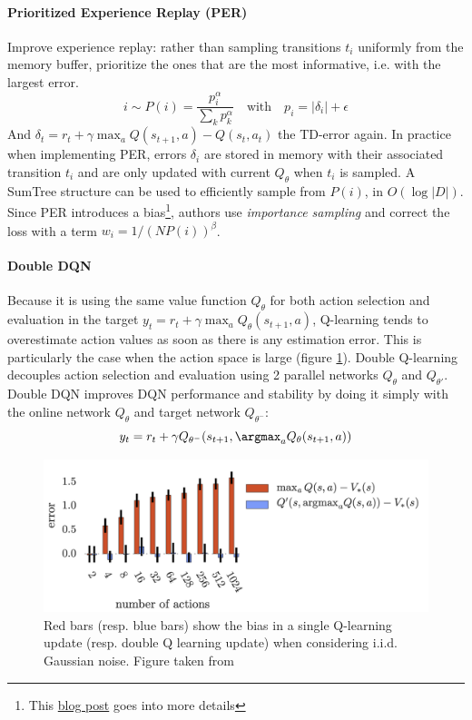 \paragraph{Prioritized Experience Replay (PER) \cite{schaul2015prioritized}}
Improve experience replay: rather than sampling transitions $t_i$ uniformly from the memory buffer, prioritize the ones that are the most informative, i.e. with the largest error.
\[
i \sim P(i) = \frac{p_i^\alpha}{\sum_k p_k^\alpha}
\quad \text{with} \quad
p_i = |\delta_i| + \epsilon
\]
And $\delta_t = r_t + \gamma \max_a Q(s_{t+1},a) - Q(s_t, a_t)$ the TD-error again. In practice when implementing PER, errors $\delta_i$ are stored in memory with their associated transition $t_i$ and are only updated with current $Q_\theta$ when $t_i$ is sampled. A SumTree structure can be used to efficiently sample from $P(i)$, in $O(\log |D|)$. Since PER introduces a bias\footnote{This \href{https://danieltakeshi.github.io/2019/07/14/per/}{blog post} goes into more details}, authors use \emph{importance sampling} and correct the loss with a term $w_i = 1 / (N P(i))^\beta$.

\paragraph{Double DQN \cite{van2016deep}}
Because it is using the same value function $Q_\theta$ for both action selection and evaluation in the target $y_t = r_t + \gamma \max_a Q_\theta(s_{t+1}, a)$, Q-learning tends to overestimate action values as soon as there is any estimation error. This is particularly the case when the action space is large (figure \ref{fig:double-dqn}). Double Q-learning \cite{hasselt2010double} decouples action selection and evaluation using 2 parallel networks $Q_\theta$ and $Q_{\theta'}$. Double DQN \cite{van2016deep} improves DQN performance and stability by doing it simply with the online network $Q_\theta$ and target network $Q_{\theta^-}$:
\[
    y_t = r_t + \gamma Q_{\theta^-}(s_{t+1}, \argmax_a Q_\theta(s_{t+1}, a))
\]

\begin{figure}[H]
    \centering
    \includegraphics[width=0.5\linewidth]{figures/double-dqn.png}
    \caption{Red bars (resp. blue bars) show the bias in a single Q-learning update (resp. double Q learning update) when considering i.i.d. Gaussian noise. Figure taken from \cite{van2016deep}}
    \label{fig:double-dqn}
\end{figure}

